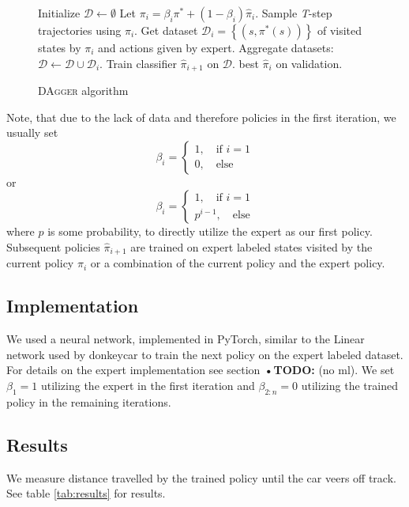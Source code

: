 \documentclass[conference]{IEEEtran}
\begin{document}
\begin{figure}[h]
\begin{algorithmic}[1]
\STATE Initialize \(\mathcal{D}\gets \emptyset\)
\STATE Let \( \pi_i = \beta_i \pi^* + \left( 1- \beta_i\right)\hat{ \pi}_i \).
\STATE Sample \textit{T}-step trajectories using \( \pi_i \).
\STATE Get dataset \( \mathcal{D}_i = \left\{ \left( s, \pi^*(s)\right)\right\} \) of visited states by \( \pi_i \) and actions given by expert.
\STATE Aggregate datasets: \( \mathcal{D}\gets \mathcal{D} \cup \mathcal{D}_i \).
\STATE Train classifier \( \hat{ \pi}_{i+1} \) on \( \mathcal{D} \).
\ENDFOR
\RETURN best \( \hat{ \pi}_i \) on validation.
\end{algorithmic}
\caption{DA\textsc{gger} algorithm}
\label{fig:dagger}
\end{figure}

Note, that due to the lack of data and therefore policies in the first iteration, we usually set
\[
\beta_i = \begin{cases}
1,\quad\text{if }i=1\\
0,\quad\text{else}
\end{cases}
\]
or
\[
\beta_i = \begin{cases}
1,\quad\text{if }i=1\\
p^{i-1},\quad\text{else}
\end{cases}
\]
where \( p \) is some probability, to directly utilize the expert as our first policy. Subsequent policies \( \hat{ \pi}_{i+1} \) are trained on expert labeled states visited by the current policy \( \pi_i \) or a combination of the current policy and the expert policy.

\subsection{Implementation}
We used a neural network, implemented in PyTorch, similar to the Linear network used by donkeycar to train the next policy on the expert labeled dataset. For details on the expert implementation see section \textbf{•TODO:} (no ml). We set \( \beta_1 = 1 \) utilizing the expert in the first iteration and \( \beta_{2:n} = 0 \) utilizing the trained policy in the remaining iterations.

\subsection{Results}
We measure distance travelled by the trained policy until the car veers off track. See table \ref{tab:results} for results.
\end{document}
